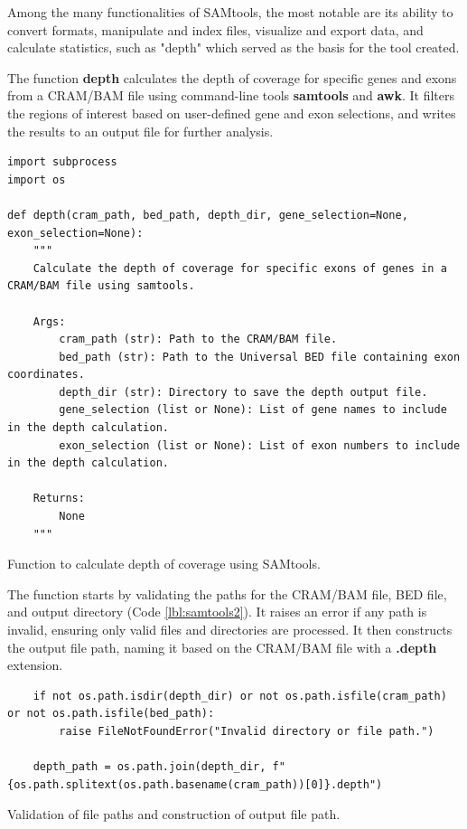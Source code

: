 Among the many functionalities of SAMtools, the most notable are its ability to convert formats, manipulate and index files, visualize and export data, and calculate statistics, such as "depth" which served as the basis for the tool created. \cite{samtools}

The function \textbf{depth} calculates the depth of coverage for specific genes and exons from a CRAM/BAM file using command-line tools \textbf{samtools} and \textbf{awk}. It filters the regions of interest based on user-defined gene and exon selections, and writes the results to an output file for further analysis.

\begin{listing}[H]
\begin{verbatim}
import subprocess
import os

def depth(cram_path, bed_path, depth_dir, gene_selection=None, exon_selection=None):
    """
    Calculate the depth of coverage for specific exons of genes in a CRAM/BAM file using samtools.

    Args:
        cram_path (str): Path to the CRAM/BAM file.
        bed_path (str): Path to the Universal BED file containing exon coordinates.
        depth_dir (str): Directory to save the depth output file.
        gene_selection (list or None): List of gene names to include in the depth calculation.
        exon_selection (list or None): List of exon numbers to include in the depth calculation.

    Returns:
        None
    """
\end{verbatim}
\caption{Function to calculate depth of coverage using SAMtools.}
\label{lbl:samtools1}
\end{listing}

The function starts by validating the paths for the CRAM/BAM file, BED file, and output directory (Code \ref{lbl:samtools2}). It raises an error if any path is invalid, ensuring only valid files and directories are processed. It then constructs the output file path, naming it based on the CRAM/BAM file with a \textbf{.depth} extension.


\begin{listing}[H]
\begin{verbatim}
    if not os.path.isdir(depth_dir) or not os.path.isfile(cram_path) or not os.path.isfile(bed_path):
        raise FileNotFoundError("Invalid directory or file path.")
    
    depth_path = os.path.join(depth_dir, f"{os.path.splitext(os.path.basename(cram_path))[0]}.depth")
\end{verbatim}
\caption{Validation of file paths and construction of output file path.}
\label{lbl:samtools2}
\end{listing}

